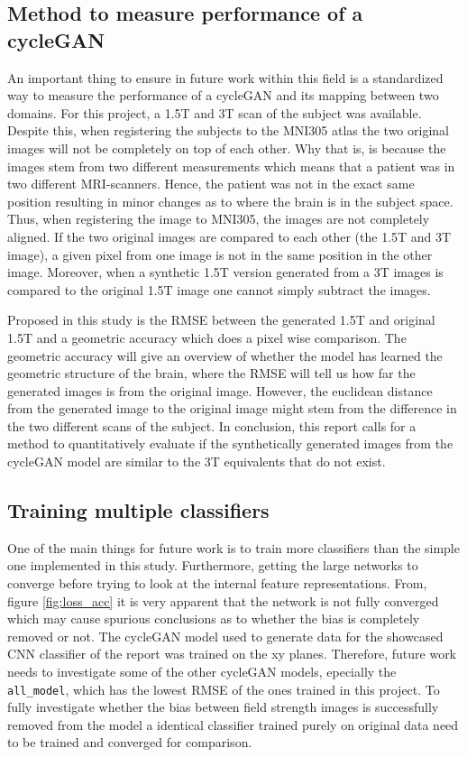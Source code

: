 \documentclass[12pt, fleqn, titlepage]{article}
\newcommand{\1}[1]{\mathds{1}\left[#1\right]}
\begin{document}
\subsection{Method to measure performance of a cycleGAN}\label{fture_work_measure}
An important thing to ensure in future work within this field is a standardized way to measure the performance of a cycleGAN and its mapping between two domains. For this project, a 1.5T and 3T scan of the subject was available. Despite this, when registering the subjects to the MNI305 atlas the two original images will not be completely on top of each other. Why that is, is because the images stem from two different measurements which means that a patient was in two different MRI-scanners. Hence, the patient was not in the exact same position resulting in minor changes as to where the brain is in the subject space. Thus, when registering the image to MNI305, the images are not completely aligned. If the two original images are compared to each other (the 1.5T and 3T image), a given pixel from one image is not in the same position in the other image. Moreover, when a synthetic 1.5T version generated from a 3T images is compared to the original 1.5T image one cannot simply subtract the images.

Proposed in this study is the RMSE between the generated 1.5T and original 1.5T and a geometric accuracy which does a pixel wise comparison. The geometric accuracy will give an overview of whether the model has learned the geometric structure of the brain, where the RMSE will tell us how far the generated images is from the original  image. However, the euclidean distance from the generated image to the original image might stem from the difference in the two different scans of the subject. In conclusion, this report calls for a method to quantitatively evaluate if the synthetically generated images from the cycleGAN model are similar to the 3T equivalents that do not exist. 

\subsection{Training multiple classifiers}\label{future_work_mult}


One of the main things for future work is to train more classifiers than the simple one implemented in this study. Furthermore, getting the large networks to converge before trying to look at the internal feature representations. From, figure \ref{fig:loss_acc} it is very apparent that the network is not fully converged which may cause spurious conclusions as to whether the bias is completely removed or not. The cycleGAN model used to generate data for the showcased CNN classifier of the report was trained on the xy planes. Therefore, future work needs to investigate some of the other cycleGAN models, epecially the \texttt{all\_model}, which has the lowest RMSE of the ones trained in this project. To fully investigate whether the bias between field strength images is successfully removed from the model a identical classifier trained purely on original data need to be trained and converged for comparison.
\end{document}

